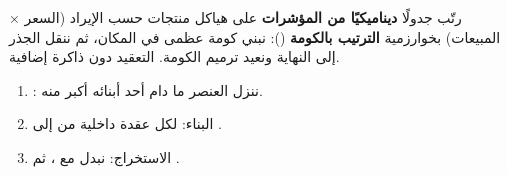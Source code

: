 \begin{statement}
رتّب جدولًا \textbf{ديناميكيًا من المؤشرات} على هياكل منتجات حسب الإيراد (السعر × المبيعات) بخوارزمية \textbf{الترتيب بالكومة} (): نبني كومة عظمى في المكان، ثم ننقل الجذر إلى النهاية ونعيد ترميم الكومة. التعقيد  دون ذاكرة إضافية.
\end{statement}
\begin{stepsbox}\begin{enumerate}
\item {}: ننزل العنصر ما دام أحد أبنائه أكبر منه.
\item البناء:  لكل عقدة داخلية من  إلى .
\item الاستخراج: نبدل  مع ، ثم .
\end{enumerate}\end{stepsbox}
